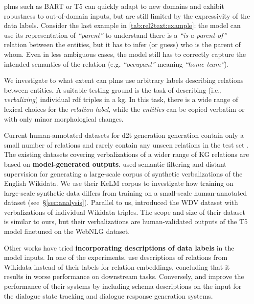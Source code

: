 \acp{plm} such as BART \cite{lewisBARTDenoisingSequencetoSequence2019} or T5 \cite{raffelExploringLimitsTransfer2019} can quickly adapt to new domains and exhibit robustness to out-of-domain inputs, but are still limited by the expressivity of the data labels. Consider the last example in \autoref{tab:rel2text:example}: the model can use its representation of \textit{``parent''} to understand there is a \textit{``is-a-parent-of''} relation between the entities, but it has to infer (or guess) who is the parent of whom. Even in less ambiguous cases, the model still has to correctly capture the intended semantics of the relation (e.g. \textit{``occupant''} meaning \textit{``home team''}).



We investigate to what extent can \acp{plm} use arbitrary labels describing relations between entities. A suitable testing ground is the task of describing (i.e., \textit{verbalizing}) individual \acs{rdf} triples in a \ac{kg}. In this task, there is a wide range of lexical choices for the \textit{relation label}, while the \textit{entities} can be copied verbatim or with only minor morphological changes.

Current human-annotated datasets for \ac{d2t} generation generation contain only a small number of relations and rarely contain any unseen relations in the test set \cite{mille2021automatic}.
The existing datasets covering verbalizations of a wider range of KG relations are based on \textbf{model-generated outputs}. \citet{agarwal2021knowledge} used semantic filtering and distant supervision for generating a large-scale corpus of synthetic verbalizations of the English Wikidata. We use their KeLM corpus to investigate how training on large-scale synthetic data differs from training on a small-scale human-annotated dataset (see\ §\ref{sec:analysis}). Parallel to us, \citet{amaral2022wdv} introduced the WDV dataset with verbalizations of individual Wikidata triples. The scope and size of their dataset is similar to ours, but their verbalizations are human-validated outputs of the T5 model \cite{raffel2020exploring} finetuned on the WebNLG dataset.

Other works have tried \textbf{incorporating descriptions of data labels} in the model inputs. In one of the experiments, \citet{wang2021kepler} use descriptions of relations from Wikidata instead of their labels for relation embeddings, concluding that it results in worse performance on downstream tasks. Conversely, \citet{kale-rastogi-2020-template} and \citet{lee2021dialogue} improve the performance of their systems by including schema descriptions on the input for the dialogue state tracking and dialogue response generation systems.


